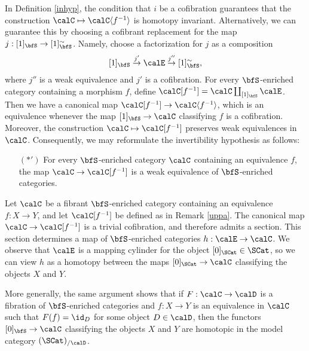 \begin{Simplicial Categories}
\begin{remark}\label{uppa}
In Definition \ref{inhyp}, the condition that $i$ be a cofibration guarantees that
the construction $\calC \mapsto \calC \langle f^{-1} \rangle$ is homotopy invariant.
Alternatively, we can guarantee this by choosing a cofibrant replacement for the
map $j: [1]_{\bfS} \rightarrow [1]^{\sim}_{\bfS}$. Namely, choose a factorization for
$j$ as a composition
$$ [1]_{\bfS} \stackrel{j'}{\rightarrow} \calE \stackrel{j''}{\rightarrow} [1]^{\sim}_{\bfS},$$
where $j''$ is a weak equivalence and $j'$ is a cofibration. For every
$\bfS$-enriched category containing a morphism $f$, define
$\calC [f^{-1} ] = \calC \coprod_{ [1]_{\bfS} } \calE$. 
Then we have a canonical map $\calC [f^{-1}] \rightarrow \calC \langle f^{-1} \rangle$,
which is an equivalence whenever the map $[1]_{\bfS} \rightarrow \calC$ classifying $f$ is a cofibration. Moreover, the construction $\calC \mapsto \calC[f^{-1}]$ preserves weak equivalences in $\calC$. Consequently, we may reformulate the invertibility hypothesis as follows:
\begin{itemize}
\item[$(\ast')$] For every $\bfS$-enriched category $\calC$ containing an equivalence
$f$, the map $\calC \rightarrow \calC[f^{-1}]$ is a weak equivalence of $\bfS$-enriched categories.
\end{itemize}
\end{remark}

\begin{remark}\label{cuddle}
Let $\calC$ be a fibrant $\bfS$-enriched category containing an equivalence
$f: X \rightarrow Y$, and let $\calC[ f^{-1} ]$ be defined as in Remark \ref{uppa}. 
The canonical map $\calC \rightarrow \calC[f^{-1}]$ is a trivial cofibration, and
therefore admits a section. This section determines a map of $\bfS$-enriched
categories $h: \calE \rightarrow \calC$. We observe that $\calE$ is a mapping
cylinder for the object $[0]_{\SCat} \in \SCat$, so we can view
$h$ as a homotopy between the maps $[0]_{\SCat} \rightarrow \calC$
classifying the objects $X$ and $Y$.

More generally, the same argument shows that if $F: \calC \rightarrow \calD$
is a fibration of $\bfS$-enriched categories and $f: X \rightarrow Y$ is an equivalence
in $\calC$ such that $F(f) = \id_{D}$ for some object $D \in \calD$, then
the functors $[0]_{\bfS} \rightarrow \calC$ classifying the objects $X$ and $Y$
are homotopic in the model category $( \SCat)_{/ \calD}$. 
\end{remark}


\end{Simplicial Categories}
